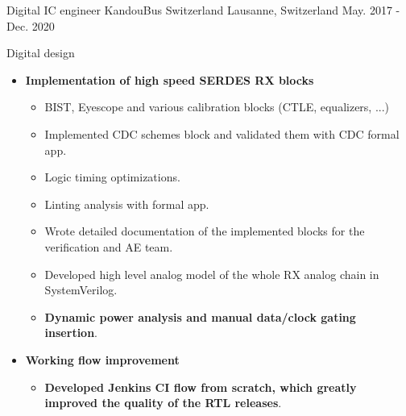 

\begin{cventries}

  \cventry
    {Digital IC engineer} %
    {KandouBus Switzerland} %
    {Lausanne, Switzerland} %
    {May. 2017 - Dec. 2020} %
    {
      \begin{cvitems} %
        \item {Digital design}
        \begin{itemize}
          \item {\textbf{Implementation of high speed SERDES RX blocks}}
          \begin{itemize}
            \item {BIST, Eyescope and various calibration blocks (CTLE, equalizers, ...)}
            \item {Implemented CDC schemes block and validated them with CDC formal app.}
            \item {Logic timing optimizations.}
            \item {Linting analysis with formal app.}
            \item {Wrote detailed documentation of the implemented blocks for the verification and AE team.}
            \item {Developed high level analog model of the whole RX analog chain in SystemVerilog.}
            \item {\textbf{Dynamic power analysis and manual data/clock gating insertion}.}
          \end{itemize}
          \item {\textbf{Working flow improvement}}
          \begin{itemize}
            \item {\textbf{Developed Jenkins CI flow from scratch, which greatly improved the quality of the RTL releases}.}

\end{itemize}
\end{itemize}
\end{cvitems}}
\end{cventries}

